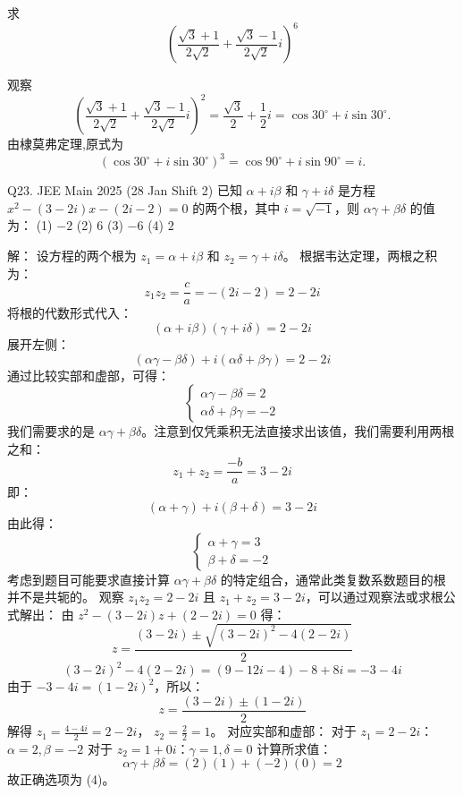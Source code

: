 \begin{questions}
    \question 求
    \[
    \left(\frac{\sqrt{3}+1}{2\sqrt{2}} + \frac{\sqrt{3}-1}{2\sqrt{2}} i \right)^6
    \]
    \begin{solution}
        观察
        \[
        \left(\frac{\sqrt{3}+1}{2\sqrt{2}} + \frac{\sqrt{3}-1}{2\sqrt{2}} i \right)^2 
        = \frac{\sqrt{3}}{2} + \frac{1}{2} i 
        = \cos 30^\circ + i \sin 30^\circ.
        \]
        由棣莫弗定理,原式为
        \[
        (\cos 30^\circ + i \sin 30^\circ)^3 = \cos 90^\circ + i \sin 90^\circ = i.
        \]
    \end{solution}

    \question Q23. JEE Main 2025 (28 Jan Shift 2)
已知 $\alpha + i\beta$ 和 $\gamma + i\delta$ 是方程 $x^2 - (3 - 2i)x - (2i - 2) = 0$ 的两个根，其中 $i = \sqrt{-1}$，则 $\alpha\gamma + \beta\delta$ 的值为：
(1) $-2$ \quad (2) $6$ \quad (3) $-6$ \quad (4) $2$

\begin{solution}
解：
设方程的两个根为 $z_1 = \alpha + i\beta$ 和 $z_2 = \gamma + i\delta$。
根据韦达定理，两根之积为：
\[
z_1 z_2 = \frac{c}{a} = -(2i - 2) = 2 - 2i
\]
将根的代数形式代入：
\[
(\alpha + i\beta)(\gamma + i\delta) = 2 - 2i
\]
展开左侧：
\[
(\alpha\gamma - \beta\delta) + i(\alpha\delta + \beta\gamma) = 2 - 2i
\]
通过比较实部和虚部，可得：
\[
\begin{cases} \alpha\gamma - \beta\delta = 2 \\ \alpha\delta + \beta\gamma = -2 \end{cases}
\]
我们需要求的是 $\alpha\gamma + \beta\delta$。注意到仅凭乘积无法直接求出该值，我们需要利用两根之和：
\[
z_1 + z_2 = \frac{-b}{a} = 3 - 2i
\]
即：
\[
(\alpha + \gamma) + i(\beta + \delta) = 3 - 2i
\]
由此得：
\[
\begin{cases} \alpha + \gamma = 3 \\ \beta + \delta = -2 \end{cases}
\]
考虑到题目可能要求直接计算 $\alpha\gamma + \beta\delta$ 的特定组合，通常此类复数系数题目的根并不是共轭的。
观察 $z_1 z_2 = 2 - 2i$ 且 $z_1 + z_2 = 3 - 2i$，可以通过观察法或求根公式解出：
由 $z^2 - (3-2i)z + (2-2i) = 0$ 得：
\[
z = \frac{(3-2i) \pm \sqrt{(3-2i)^2 - 4(2-2i)}}{2}
\]
\[
(3-2i)^2 - 4(2-2i) = (9 - 12i - 4) - 8 + 8i = -3 - 4i
\]
由于 $-3 - 4i = (1 - 2i)^2$，所以：
\[
z = \frac{(3-2i) \pm (1-2i)}{2}
\]
解得 $z_1 = \frac{4-4i}{2} = 2-2i$， $z_2 = \frac{2}{2} = 1$。
对应实部和虚部：
对于 $z_1 = 2-2i$：$\alpha = 2, \beta = -2$
对于 $z_2 = 1+0i$：$\gamma = 1, \delta = 0$
计算所求值：
\[
\alpha\gamma + \beta\delta = (2)(1) + (-2)(0) = 2
\]
故正确选项为 (4)。
\end{solution}


\end{questions}
